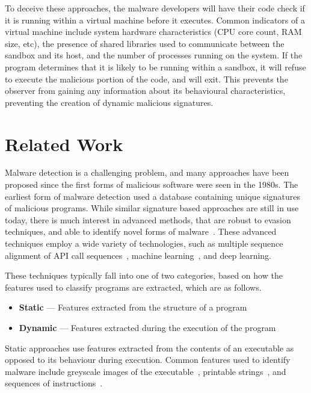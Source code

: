 \documentclass[main.tex]{subfiles}
\begin{document}
To deceive these approaches, the malware developers will have their code check if it is running within a virtual machine before it executes. Common indicators of a virtual machine include system hardware characteristics (CPU core count, RAM size, etc), the presence of shared libraries used to communicate between the sandbox and its host, and the number of processes running on the system. If the program determines that it is likely to be running within a sandbox, it will refuse to execute the malicious portion of the code, and will exit. This prevents the observer from gaining any information about its behavioural characteristics, preventing the creation of dynamic malicious signatures. 


\section{Related Work}

Malware detection is a challenging problem, and many approaches have been proposed since the first forms of malicious software were seen in the 1980s. The earliest form of malware detection used a database containing unique signatures of malicious programs. While similar signature based approaches are still in use today, there is much interest in advanced methods, that are robust to evasion techniques, and able to identify novel forms of malware~\citep{m.ComprehensiveSurveyDeep2023,merabetSurveyMalwareDetection2019,aboaojaMalwareDetectionIssues2022,idikamathurSurveyMalwareDetection2007}. These advanced techniques employ a wide variety of technologies, such as multiple sequence alignment of API call sequences~\citep{kiNovelApproachDetect2015}, machine learning~\citep{kambojDetectionMalwareDownloaded2023}, and deep learning.

These techniques typically fall into one of two categories, based on how the features used to classify programs are extracted, which are as follows. 

\begin{itemize}
    \item \textbf{Static} --- Features extracted from the structure of a program
    \item \textbf{Dynamic} --- Features extracted during the execution of the program
\end{itemize}

Static approaches use features extracted from the contents of an executable as opposed to its behaviour during execution. Common features used to identify malware include greyscale images of the executable~\citep{niMalwareIdentificationUsing2018,jainConvolutionalNeuralNetworks2020,habibiPerformanceEvaluationCNN2023}, printable strings~\citep{tianAutomatedClassificationSystem2009,singhDetectionMaliciousSoftware2020,schultzDataMiningMethods2001a}, and sequences of instructions~\citep{kakisimSequentialOpcodeEmbeddingbased2022,wangDeepLearningRegularization2021,daremVisualizationDeeplearningbasedMalware2021}. 
\end{document}
